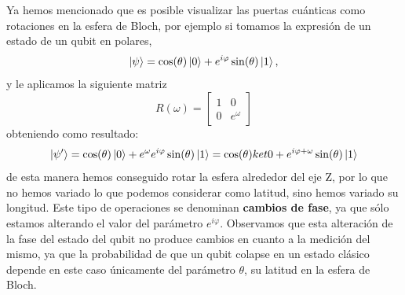 \documentclass[a4paper]{article}
\numberwithin{equation}{section}
\begin{document}
Ya hemos mencionado que es posible visualizar las puertas cuánticas como rotaciones en la esfera de Bloch, por ejemplo si tomamos la expresión de un estado de un qubit en polares,
\begin{equation}
\ket{\psi} = \cos(\theta)\ket{0} + e^{i\varphi}\sin(\theta)\ket{1},
\end{equation}
y le aplicamos la siguiente matriz
\begin{equation}
R(\omega) = \begin{bmatrix}
	1 & 0 \\
	0 & e^\omega
\end{bmatrix} 
\end{equation}
obteniendo como resultado:
\begin{equation}
\ket{\psi'} = \cos(\theta)\ket{0} + e^\omega e^{i\varphi}\sin(\theta)\ket{1} = \cos(\theta)ket{0} + e^{i\varphi + \omega}\sin(\theta)\ket{1}
\end{equation}
de esta manera hemos conseguido rotar la esfera alrededor del eje Z, por lo que no hemos variado lo que podemos considerar como latitud, sino hemos variado su longitud. Este tipo de operaciones se denominan \textbf{cambios de fase}, ya que sólo estamos alterando el valor del parámetro $e^{i\varphi}$. Observamos que esta alteración de la fase del estado del qubit no produce cambios en cuanto a la medición del mismo, ya que la probabilidad de que un qubit colapse en un estado clásico depende en este caso únicamente del parámetro $\theta$, su latitud en la esfera de Bloch.
\end{document}
